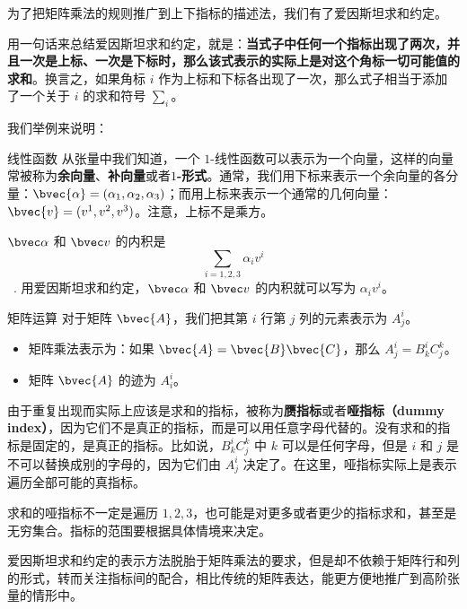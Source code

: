为了把矩阵乘法的规则推广到上下指标的描述法，我们有了爱因斯坦求和约定。

用一句话来总结爱因斯坦求和约定，就是：\textbf{当式子中任何一个指标出现了两次，并且一次是上标、一次是下标时，那么该式表示的实际上是对这个角标一切可能值的求和}。换言之，如果角标 $i$ 作为上标和下标各出现了一次，那么式子相当于添加了一个关于 $i$ 的求和符号 $\sum_i$。

我们举例来说明：

\begin{example}{线性函数}
从张量中我们知道，一个 $1$-线性函数可以表示为一个向量，这样的向量常被称为\textbf{余向量}、\textbf{补向量}或者\textbf{$1$-形式}。通常，我们用下标来表示一个余向量的各分量：$\bvec{\alpha}=(\alpha_1, \alpha_2, \alpha_3)$；而用上标来表示一个通常的几何向量：$\bvec{v}=(v^1, v^2, v^3)$。注意，上标不是乘方。

$\bvec\alpha$ 和 $\bvec v$ 的内积是$$\sum\limits_{i=1, 2, 3}\alpha_i v^i$$~.
用爱因斯坦求和约定，$\bvec\alpha$ 和 $\bvec v$ 的内积就可以写为 $\alpha_i v^i$。
\end{example}

\begin{example}{矩阵运算}
对于矩阵 $\bvec{A}$，我们把其第 $i$ 行第 $j$ 列的元素表示为 $A^i_j$。
\begin{itemize}
\item 矩阵乘法表示为：如果 $\bvec{A}=\bvec{B}\bvec{C}$，那么 $A^i_j=B^i_k C^k_j$。
\item 矩阵 $\bvec{A}$ 的迹为 $A^i_i$。

\end{itemize}
\end{example}

由于重复出现而实际上应该是求和的指标，被称为\textbf{赝指标}或者\textbf{哑指标（dummy index）}，因为它们不是真正的指标，而是可以用任意字母代替的。没有求和的指标是固定的，是真正的指标。比如说，$B^i_k C^k_j$ 中 $k$ 可以是任何字母，但是 $i$ 和 $j$ 是不可以替换成别的字母的，因为它们由 $A^i_j$ 决定了。在这里，哑指标实际上是表示遍历全部可能的真指标。

求和的哑指标不一定是遍历 $1, 2, 3$，也可能是对更多或者更少的指标求和，甚至是无穷集合。指标的范围要根据具体情境来决定。

爱因斯坦求和约定的表示方法脱胎于矩阵乘法的要求，但是却不依赖于矩阵行和列的形式，转而关注指标间的配合，相比传统的矩阵表达，能更方便地推广到高阶张量的情形中。


